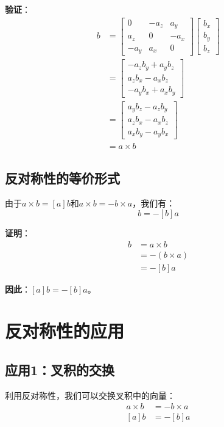 \documentclass[12pt,a4paper]{article}
\begin{document}
\textbf{验证}：
\begin{align}
[a] b &= \begin{bmatrix}
0 & -a_z & a_y \\
a_z & 0 & -a_x \\
-a_y & a_x & 0
\end{bmatrix} \begin{bmatrix}
b_x \\ b_y \\ b_z
\end{bmatrix} \\
&= \begin{bmatrix}
-a_z b_y + a_y b_z \\
a_z b_x - a_x b_z \\
-a_y b_x + a_x b_y
\end{bmatrix} \\
&= \begin{bmatrix}
a_y b_z - a_z b_y \\
a_z b_x - a_x b_z \\
a_x b_y - a_y b_x
\end{bmatrix} \\
&= a \times b
\end{align}

\subsection{反对称性的等价形式}

由于$a \times b = [a] b$和$a \times b = -b \times a$，我们有：
\begin{equation}
[a] b = -[b] a \tag{3}
\end{equation}

\textbf{证明}：
\begin{align}
[a] b &= a \times b \\
&= -(b \times a) \\
&= -[b] a
\end{align}

\textbf{因此}：$[a] b = -[b] a$。

\section{反对称性的应用}

\subsection{应用1：叉积的交换}

利用反对称性，我们可以交换叉积中的向量：
\begin{align}
a \times b &= -b \times a \\
[a] b &= -[b] a
\end{align}
\end{document}
